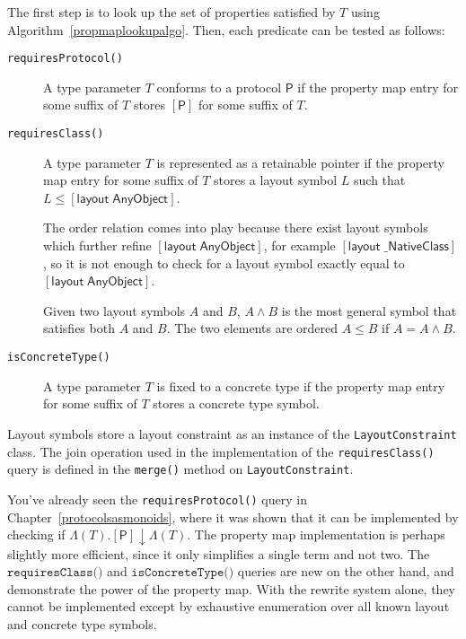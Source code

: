 \documentclass[headsepline,bibliography=totoc]{scrreport}
\newcommand{\proto}[1]{\bm{\mathsf{#1}}}
\newcommand{\protosym}[1]{[\proto{#1}]}
\newcommand{\layoutsym}[1]{[\mathsf{layout\;#1}]}
\theoremstyle{definition}
\theoremstyle{definition}
\theoremstyle{definition}
\begin{document}
The first step is to look up the set of properties satisfied by $T$ using Algorithm~\ref{propmaplookupalgo}. Then, each predicate can be tested as follows:
\begin{description}
\item[\texttt{requiresProtocol()}] A type parameter $T$ conforms to a protocol $\proto{P}$ if the property map entry for some suffix of $T$ stores $\protosym{P}$ for some suffix of $T$.
\item[\texttt{requiresClass()}] A type parameter $T$ is represented as a retainable pointer if the property map entry for some suffix of $T$ stores a layout symbol $L$ such that $L\leq\layoutsym{AnyObject}$.

The order relation comes into play because there exist layout symbols which further refine $\layoutsym{AnyObject}$, for example $\layoutsym{\_NativeClass}$, so it is not enough to check for a layout symbol exactly equal to $\layoutsym{AnyObject}$.

Given two layout symbols $A$ and $B$, $A\wedge B$ is the most general symbol that satisfies both $A$ and $B$. The two elements are ordered $A\leq B$ if $A=A\wedge B$.
\item[\texttt{isConcreteType()}] A type parameter $T$ is fixed to a concrete type if the property map entry for some suffix of $T$ stores a concrete type symbol.
\end{description}
\begin{leftbar}
\noindent Layout symbols store a layout constraint as an instance of the \texttt{LayoutConstraint} class. The join operation used in the implementation of the \texttt{requiresClass()} query is defined in the \texttt{merge()} method on \texttt{LayoutConstraint}.
\end{leftbar}
You've already seen the \texttt{requiresProtocol()} query in Chapter~\ref{protocolsasmonoids}, where it was shown that it can be implemented by checking if $\Lambda(T).\protosym{P}\downarrow\Lambda(T)$. The property map implementation is perhaps slightly more efficient, since it only simplifies a single term and not two. The $\texttt{requiresClass()}$ and $\texttt{isConcreteType()}$ queries are new on the other hand, and demonstrate the power of the property map. With the rewrite system alone, they cannot be implemented except by exhaustive enumeration over all known layout and concrete type symbols.
\end{document}
